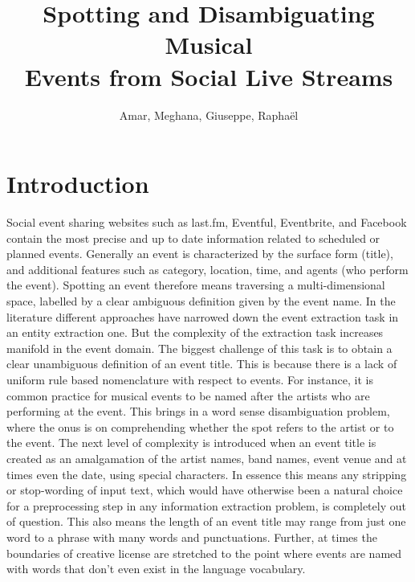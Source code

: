 \documentclass[10pt,a4paper]{article}
\author{Amar, Meghana, Giuseppe, Rapha\"el}
\title{Spotting and Disambiguating Musical\\Events from Social Live Streams}
\begin{document}
\maketitle
\section{Introduction}
\label{sec:introduction}
Social event sharing websites such as last.fm, Eventful, Eventbrite, and Facebook contain the most precise and up to date information related to scheduled or planned events. 
Generally an event is characterized by the surface form (title), and additional features such as category, location, time, and agents (who perform the event). Spotting an event therefore means traversing a multi-dimensional space, labelled by a clear ambiguous definition given by the event name. 
In the literature different approaches have narrowed down the event extraction task in an entity extraction one. But the complexity of the extraction task increases manifold in the event domain. The biggest challenge of this task is to obtain a clear unambiguous definition of an event title. This is because there is a lack of uniform rule based nomenclature with respect to events. 
For instance, it is common practice for musical events to be named after the artists who are performing at the event. 
This brings in a word sense disambiguation problem, where the onus is on comprehending whether the spot refers to the artist or to the event. The next level of complexity is introduced when an event title is created as an amalgamation of the artist names, band names, event venue and at times even the date, using special characters. %
In essence this means any stripping or stop-wording of input text, which would have otherwise been a natural choice for a preprocessing step in any information extraction problem, is completely out of question. This also means the length of an event title may range from just one word to a phrase with many words and punctuations. Further, at times the boundaries of creative license are stretched to the point where events are named with words that don't even exist in the language vocabulary. 
\end{document}

